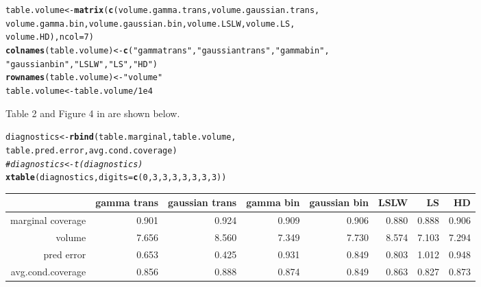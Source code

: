 \documentclass[11pt]{article}\usepackage[]{graphicx}\usepackage[]{color}
\makeatletter
\newcommand{\hlnum}[1]{\textcolor[rgb]{0.686,0.059,0.569}{#1}}%
\newcommand{\hlstr}[1]{\textcolor[rgb]{0.192,0.494,0.8}{#1}}%
\newcommand{\hlcom}[1]{\textcolor[rgb]{0.678,0.584,0.686}{\textit{#1}}}%
\newcommand{\hlopt}[1]{\textcolor[rgb]{0,0,0}{#1}}%
\newcommand{\hlstd}[1]{\textcolor[rgb]{0.345,0.345,0.345}{#1}}%
\newcommand{\hlkwb}[1]{\textcolor[rgb]{0.69,0.353,0.396}{#1}}%
\newcommand{\hlkwc}[1]{\textcolor[rgb]{0.333,0.667,0.333}{#1}}%
\newcommand{\hlkwd}[1]{\textcolor[rgb]{0.737,0.353,0.396}{\textbf{#1}}}%
\newenvironment{kframe}{%
 \def\at@end@of@kframe{}%
 \ifinner\ifhmode%
  \def\at@end@of@kframe{\end{minipage}}%
  \begin{minipage}{\columnwidth}%
 \fi\fi%
 \def\FrameCommand##1{\hskip\@totalleftmargin \hskip-\fboxsep
 \colorbox{shadecolor}{##1}\hskip-\fboxsep
     \hskip-\linewidth \hskip-\@totalleftmargin \hskip\columnwidth}%
 \MakeFramed {\advance\hsize-\width
   \@totalleftmargin\z@ \linewidth\hsize
   \@setminipage}}%
 {\par\unskip\endMakeFramed%
 \at@end@of@kframe}
\newenvironment{knitrout}{}{} %
\makeatother
\begin{document}
\begin{knitrout}
\begin{kframe}
\begin{alltt}
\hlstd{table.volume} \hlkwb{<-} \hlkwd{matrix}\hlstd{(}\hlkwd{c}\hlstd{(volume.gamma.trans, volume.gaussian.trans,}
  \hlstd{volume.gamma.bin, volume.gaussian.bin, volume.LSLW, volume.LS,}
  \hlstd{volume.HD),} \hlkwc{ncol} \hlstd{=} \hlnum{7}\hlstd{)}
\hlkwd{colnames}\hlstd{(table.volume)} \hlkwb{<-} \hlkwd{c}\hlstd{(}\hlstr{"gamma trans"}\hlstd{,} \hlstr{"gaussian trans"}\hlstd{,} \hlstr{"gamma bin"}\hlstd{,}
  \hlstr{"gaussian bin"}\hlstd{,} \hlstr{"LSLW"}\hlstd{,} \hlstr{"LS"}\hlstd{,} \hlstr{"HD"}\hlstd{)}
\hlkwd{rownames}\hlstd{(table.volume)} \hlkwb{<-} \hlstr{"volume"}
\hlstd{table.volume} \hlkwb{<-} \hlstd{table.volume} \hlopt{/} \hlnum{1e4}
\end{alltt}
\end{kframe}
\end{knitrout}


Table 2 and Figure 4 in \citet{eck2019conformal} are shown below. 


\begin{kframe}
\begin{alltt}
\hlstd{diagnostics} \hlkwb{<-} \hlkwd{rbind}\hlstd{(table.marginal, table.volume,}
  \hlstd{table.pred.error, avg.cond.coverage)}
\hlcom{#diagnostics <- t(diagnostics)}
\hlkwd{xtable}\hlstd{(diagnostics,} \hlkwc{digits} \hlstd{=} \hlkwd{c}\hlstd{(}\hlnum{0}\hlstd{,} \hlnum{3}\hlstd{,} \hlnum{3}\hlstd{,} \hlnum{3}\hlstd{,} \hlnum{3}\hlstd{,} \hlnum{3}\hlstd{,} \hlnum{3}\hlstd{,} \hlnum{3}\hlstd{))}
\end{alltt}
\end{kframe}%
\begin{table}[ht]
\centering
\begin{tabular}{rrrrrrrr}
  \hline
 & gamma trans & gaussian trans & gamma bin & gaussian bin & LSLW & LS & HD \\ 
  \hline
marginal coverage & 0.901 & 0.924 & 0.909 & 0.906 & 0.880 & 0.888 & 0.906 \\ 
  volume & 7.656 & 8.560 & 7.349 & 7.730 & 8.574 & 7.103 & 7.294 \\ 
  pred error & 0.653 & 0.425 & 0.931 & 0.849 & 0.803 & 1.012 & 0.948 \\ 
  avg.cond.coverage & 0.856 & 0.888 & 0.874 & 0.849 & 0.863 & 0.827 & 0.873 \\ 
   \hline
\end{tabular}
\end{table}
\end{document}
